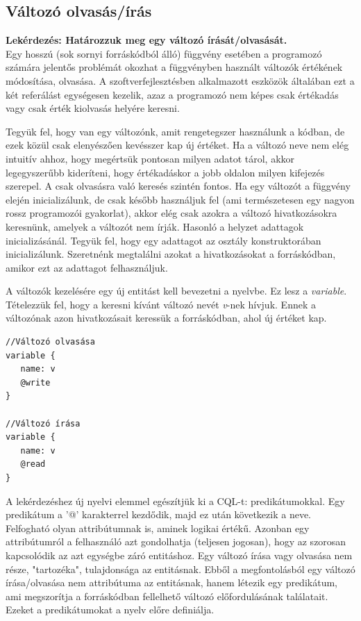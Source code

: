 \documentclass[a4paper,12pt]{report}
\begin{document}
\subsection{Változó olvasás/írás}
\textbf{Lekérdezés: Határozzuk meg egy változó írását/olvasását.}
\\
Egy hosszú (sok sornyi forráskódból álló) függvény esetében a programozó számára jelentős problémát okozhat a függvényben használt változók értékének módosítása, olvasása. A szoftverfejlesztésben alkalmazott eszközök általában ezt a két referálást egységesen kezelik, azaz a programozó nem képes csak értékadás vagy csak érték kiolvasás helyére keresni. 
\par Tegyük fel, hogy van egy változónk, amit rengetegszer használunk a kódban, de ezek közül csak elenyészően kevésszer kap új értéket. Ha a változó neve nem elég intuitív ahhoz, hogy megértsük pontosan milyen adatot tárol, akkor legegyszerűbb kideríteni, hogy értékadáskor a jobb oldalon milyen kifejezés szerepel. A csak olvasásra való keresés szintén fontos. Ha egy változót a függvény elején inicializálunk, de csak később használjuk fel (ami természetesen egy nagyon rossz programozói gyakorlat), akkor elég csak azokra a változó hivatkozásokra keresnünk, amelyek a változót nem írják. Hasonló a helyzet adattagok inicializásánál. Tegyük fel, hogy egy adattagot az osztály konstruktorában inicializálunk. Szeretnénk megtalálni azokat a hivatkozásokat a forráskódban, amikor ezt az adattagot felhasználjuk.
\par A változók kezelésére egy új entitást kell bevezetni a nyelvbe. Ez lesz a \textit{variable}. Tételezzük fel, hogy a keresni kívánt változó nevét \textit{v}-nek hívjuk. Ennek a változónak azon hivatkozásait keressük a forráskódban, ahol új értéket kap.
\begin{verbatim}
//Változó olvasása
variable {
   name: v
   @write
}

//Változó írása
variable {
   name: v
   @read
}
\end{verbatim}
\par A lekérdezéshez új nyelvi elemmel egészítjük ki a CQL-t: predikátumokkal. Egy predikátum a '@' karakterrel kezdődik, majd ez után következik a neve. Felfogható olyan attribútumnak is, aminek logikai értékű. Azonban egy attribútumról a felhasználó azt gondolhatja (teljesen jogosan), hogy az szorosan kapcsolódik az azt egységbe záró entitáshoz. Egy változó írása vagy olvasása nem része, "tartozéka", tulajdonsága az entitásnak. Ebből a megfontolásból egy változó írása/olvasása nem attribútuma az entitásnak, hanem létezik egy predikátum, ami megszorítja a forráskódban fellelhető változó előfordulásának találatait. Ezeket a predikátumokat a nyelv előre definiálja.
\end{document}
